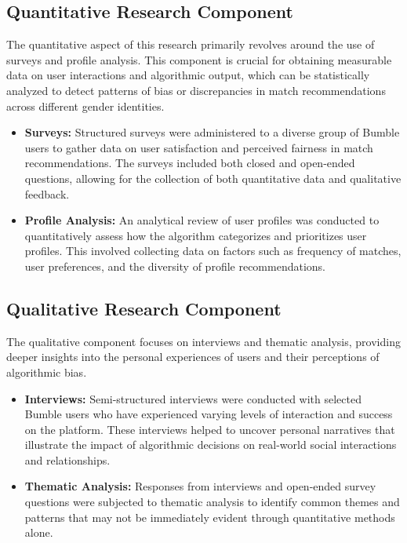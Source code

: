 \subsection{Quantitative Research Component}
The quantitative aspect of this research primarily revolves around the use of surveys and profile analysis. This component is crucial for obtaining measurable data on user interactions and algorithmic output, which can be statistically analyzed to detect patterns of bias or discrepancies in match recommendations across different gender identities.

\begin{itemize}
    \item \textbf{Surveys:} Structured surveys were administered to a diverse group of Bumble users to gather data on user satisfaction and perceived fairness in match recommendations. The surveys included both closed and open-ended questions, allowing for the collection of both quantitative data and qualitative feedback.
    \item \textbf{Profile Analysis:} An analytical review of user profiles was conducted to quantitatively assess how the algorithm categorizes and prioritizes user profiles. This involved collecting data on factors such as frequency of matches, user preferences, and the diversity of profile recommendations. 
\end{itemize}

\subsection{Qualitative Research Component}
The qualitative component focuses on interviews and thematic analysis, providing deeper insights into the personal experiences of users and their perceptions of algorithmic bias.

\begin{itemize}
    \item \textbf{Interviews:} Semi-structured interviews were conducted with selected Bumble users who have experienced varying levels of interaction and success on the platform. These interviews helped to uncover personal narratives that illustrate the impact of algorithmic decisions on real-world social interactions and relationships.
    \item \textbf{Thematic Analysis:} Responses from interviews and open-ended survey questions were subjected to thematic analysis to identify common themes and patterns that may not be immediately evident through quantitative methods alone.
\end{itemize}

